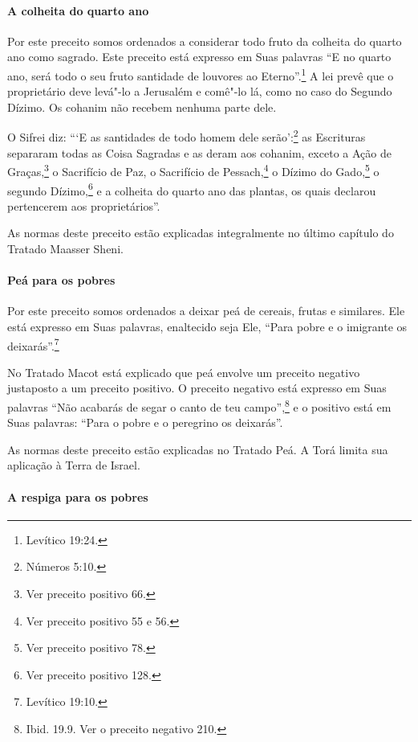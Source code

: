 \begin{multicols}{2}
\paragraph{A colheita do quarto ano}

Por este preceito somos ordenados a considerar todo fruto da colheita
do quarto ano como sagrado. Este preceito está expresso em Suas
palavras ``E no quarto ano, será todo o seu fruto santidade de louvores
ao Eterno''.\footnote{Levítico 19:24.} A lei prevê que o proprietário deve
levá"-lo a Jerusalém e comê"-lo lá, como no caso do Segundo Dízimo. Os
cohanim\starr{} não recebem nenhuma parte dele.

O Sifrei\starr{} diz: ```E as santidades de todo homem dele serão':\footnote{Números 5:10.} as Escrituras separaram todas as Coisa Sagradas e as deram
aos cohanim\starr, exceto a Ação de Graças,\footnote{Ver preceito positivo 66.} o Sacrifício de Paz, o Sacrifício de Pessach\starr,\footnote{Ver preceito positivo 55 e 56.} o Dízimo do Gado,\footnote{Ver preceito positivo 78.} o segundo Dízimo,\footnote{Ver preceito positivo 128.} e a colheita do quarto ano
das plantas, os quais declarou pertencerem aos proprietários''.

As normas deste preceito estão explicadas integralmente no último
capítulo do Tratado Maasser Sheni\starr.


\paragraph{Peá\star{} para os pobres}

Por este preceito somos ordenados a deixar peá\starr{}
de cereais, frutas e similares. Ele está expresso em Suas palavras,
enaltecido seja Ele, ``Para pobre e o imigrante os deixarás''.\footnote{Levítico 19:10.}

No Tratado Macot\starr{} está explicado que peá\starr{} envolve um preceito negativo
justaposto a um preceito positivo. O preceito negativo está expresso
em Suas palavras ``Não acabarás de segar o canto de teu campo'',\footnote{Ibid.
19.9. Ver o preceito negativo 210.} e o positivo está em Suas palavras: ``Para o pobre e o peregrino os
deixarás''.

As normas deste preceito estão explicadas no Tratado Peá\starr. A Torá\starr{} limita
sua aplicação à Terra de Israel.

\paragraph{A respiga para os pobres}


\end{multicols}
